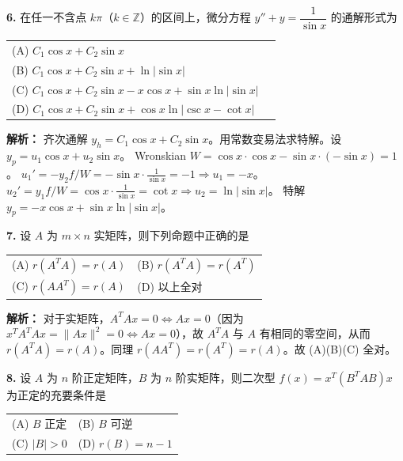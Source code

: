 \vspace{8pt}

\textbf{6.} 在任一不含点 $k\pi$（$k\in\mathbb Z$）的区间上，微分方程 $y''+y=\dfrac{1}{\sin x}$ 的通解形式为
\begin{center}
\begin{tabular}{ll}
(A) $C_1\cos x+C_2\sin x$ \\[4pt]
(B) $C_1\cos x+C_2\sin x + \ln|\sin x|$ \\[4pt]
(C) $C_1\cos x+C_2\sin x - x\cos x + \sin x\ln|\sin x|$ \\[4pt]
(D) $C_1\cos x+C_2\sin x + \cos x\ln|\csc x-\cot x|$
\end{tabular}
\end{center}

\ifshowsolutions\par\noindent\textbf{解析：} 齐次通解 $y_h=C_1\cos x+C_2\sin x$。用常数变易法求特解。设 $y_p=u_1\cos x+u_2\sin x$。
Wronskian $W=\cos x\cdot\cos x - \sin x\cdot(-\sin x)=1$。
$u_1'=-y_2f/W=-\sin x\cdot\frac{1}{\sin x}=-1 \Rightarrow u_1=-x$。
$u_2'=y_1f/W=\cos x\cdot\frac{1}{\sin x}=\cot x \Rightarrow u_2=\ln|\sin x|$。
特解 $y_p=-x\cos x+\sin x\ln|\sin x|$。\else \answerarea \fi

\vspace{8pt}

\textbf{7.} 设 $A$ 为 $m\times n$ 实矩阵，则下列命题中正确的是
\begin{center}
\begin{tabular}{ll}
(A) $r(A^T A) = r(A)$ & (B) $r(A^T A) = r(A^T)$ \\[4pt]
(C) $r(A A^T) = r(A)$ & (D) 以上全对
\end{tabular}
\end{center}

\ifshowsolutions\par\noindent\textbf{解析：} 对于实矩阵，$A^T A x=0 \iff Ax=0$（因为 $x^T A^T A x = \|Ax\|^2=0 \iff Ax=0$），故 $A^T A$ 与 $A$ 有相同的零空间，从而 $r(A^T A)=r(A)$。同理 $r(AA^T)=r(A^T)=r(A)$。故 (A)(B)(C) 全对。\else \answerarea \fi

\vspace{8pt}

\textbf{8.} 设 $A$ 为 $n$ 阶正定矩阵，$B$ 为 $n$ 阶实矩阵，则二次型 $f(x)=x^T(B^T A B)x$ 为正定的充要条件是
\begin{center}
\begin{tabular}{ll}
(A) $B$ 正定 & (B) $B$ 可逆 \\[4pt]
(C) $|B|>0$ & (D) $r(B)=n-1$
\end{tabular}
\end{center}

